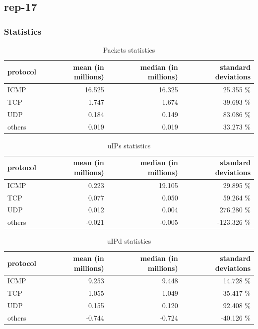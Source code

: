 \subsection*{rep-17}
\subsubsection*{Statistics}
\begin{table}[H]
\center
\begin{tabular}{lrrr}
\toprule
protocol & mean (in millions) & median (in millions) & standard deviations \\
\midrule
ICMP &   16.525  &  16.325  &  25.355 \% \\
TCP &     1.747  &   1.674  &  39.693 \% \\
UDP &     0.184  &   0.149  &  83.086 \% \\
others &  0.019  &   0.019  &  33.273 \% \\
\bottomrule
\end{tabular}
\caption{ Packets statistics }
\label{tab:proto-stats-packets}
\end{table}

\begin{table}[H]
\center
\begin{tabular}{lrrr}
\toprule
protocol & mean (in millions) & median (in millions) & standard deviations \\
\midrule
ICMP &    0.223 & 19.105 &   29.895 \% \\
TCP &     0.077 &  0.050 &   59.264 \% \\
UDP &     0.012 &  0.004 &  276.280 \% \\
others & -0.021 & -0.005 & -123.326 \% \\
\bottomrule
\end{tabular}
\caption{ uIPs statistics }
\label{tab:proto-stats-uIPs}
\end{table}

\begin{table}[H]
\center
\begin{tabular}{lrrr}
\toprule
protocol & mean (in millions) & median (in millions) & standard deviations \\
\midrule
ICMP &    9.253 &  9.448 &  14.728 \%  \\
TCP &     1.055 &  1.049 &  35.417 \%  \\
UDP &     0.155 &  0.120 &  92.408 \%  \\
others & -0.744 & -0.724 & -40.126 \%  \\
\bottomrule
\end{tabular}
\caption{ uIPd statistics }
\label{tab:proto-stats-uIPd}
\end{table}

